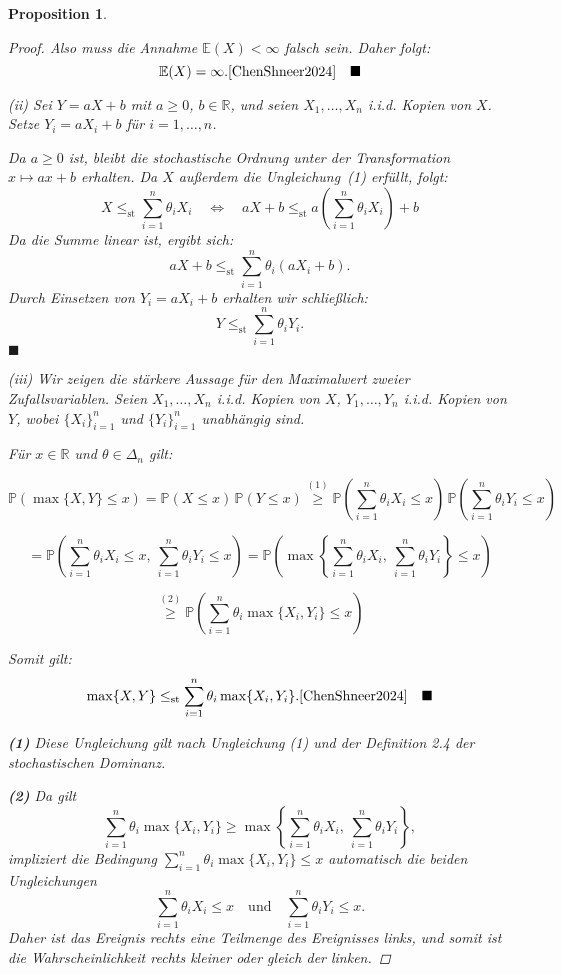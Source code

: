 \documentclass[
12pt,
fancyheadings, %
%
a4paper, 
%
]{tuhhreprt}
\newtheorem{proposition}[definition]{Proposition}
\begin{document}
\begin{proposition}
\begin{proof}
Also muss die Annahme \( \mathbb{E}(X) < \infty \) falsch sein. Daher folgt:
\[
\mathbb{E}(X) = \infty.\cite{ChenShneer2024} \quad \blacksquare
\]

\textit{(ii)} Sei \( Y = aX + b \) mit \( a \geq 0 \), \( b \in \mathbb{R} \), und seien \( X_1, \dots, X_n \) i.i.d. Kopien von \( X \). Setze \( Y_i = aX_i + b \) für \( i = 1, \dots, n \).

Da \( a \geq 0 \) ist, bleibt die stochastische Ordnung unter der Transformation \( x \mapsto ax + b \) erhalten. Da \( X \) außerdem die Ungleichung~(1) erfüllt, folgt:
\[
X \leq_{\mathrm{st}} \sum_{i=1}^n \theta_i X_i \quad \Leftrightarrow \quad aX + b \leq_{\mathrm{st}} a\left(\sum_{i=1}^n \theta_i X_i\right) + b
\]
Da die Summe linear ist, ergibt sich:
\[
aX + b \leq_{\mathrm{st}} \sum_{i=1}^n \theta_i (aX_i + b).
\]
Durch Einsetzen von \( Y_i = aX_i + b \) erhalten wir schließlich:
\[
Y \leq_{\mathrm{st}} \sum_{i=1}^n \theta_i Y_i.
\]
\hfill\ensuremath{\blacksquare}



\textit{(iii)} Wir zeigen die stärkere Aussage für den Maximalwert zweier Zufallsvariablen.  
Seien \( X_1, \dots, X_n \) i.i.d. Kopien von \( X \), \( Y_1, \dots, Y_n \) i.i.d. Kopien von \( Y \), wobei \( \{X_i\}_{i=1}^n \) und \( \{Y_i\}_{i=1}^n \) unabhängig sind.

Für \( x \in \mathbb{R} \) und \( \theta \in \Delta_n \) gilt:

\[
\mathbb{P}(\max\{X, Y\} \le x)
= \mathbb{P}(X \le x)\, \mathbb{P}(Y \le x)
\overset{(1)}{\ge} \mathbb{P}\left( \sum_{i=1}^n \theta_i X_i \le x \right)
\, \mathbb{P}\left( \sum_{i=1}^n \theta_i Y_i \le x \right)
\]

\[
= \mathbb{P}\left( \sum_{i=1}^n \theta_i X_i \le x,\ \sum_{i=1}^n \theta_i Y_i \le x \right)
= \mathbb{P}\left( \max\left\{ \sum_{i=1}^n \theta_i X_i,\ \sum_{i=1}^n \theta_i Y_i \right\} \le x \right)
\]

\[
\overset{(2)}{\ge} \mathbb{P}\left( \sum_{i=1}^n \theta_i \max\{X_i, Y_i\} \le x \right)
\]

Somit gilt:
\[
\max\{X, Y\} \le_{\mathrm{st}} \sum_{i=1}^n \theta_i \max\{X_i, Y_i\}.\cite{ChenShneer2024} \quad \blacksquare
\]

\vspace{1em}
\noindent\textbf{(1)} Diese Ungleichung gilt nach Ungleichung (1) und der Definition 2.4 der stochastischen Dominanz.

\noindent\textbf{(2)} Da gilt
\[
\sum_{i=1}^n \theta_i \max\{X_i, Y_i\} \ge \max\left\{ \sum_{i=1}^n \theta_i X_i,\ \sum_{i=1}^n \theta_i Y_i \right\},
\]
impliziert die Bedingung \( \sum_{i=1}^n \theta_i \max\{X_i, Y_i\} \le x \) automatisch die beiden Ungleichungen
\[
\sum_{i=1}^n \theta_i X_i \le x \quad \text{und} \quad \sum_{i=1}^n \theta_i Y_i \le x.
\]
Daher ist das Ereignis rechts eine Teilmenge des Ereignisses links, und somit ist die Wahrscheinlichkeit rechts kleiner oder gleich der linken.


\end{proof}
\end{proposition}
\end{document}
